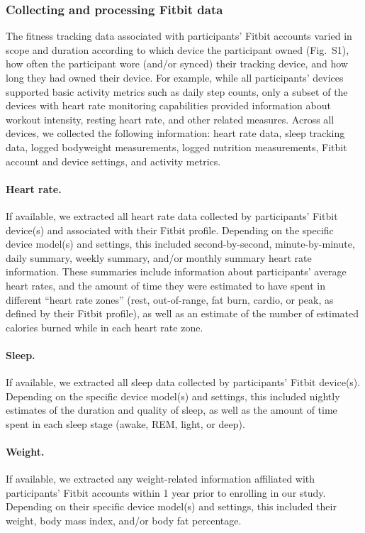 \documentclass[10pt]{article}
\newcommand{\devices}{S1}
\begin{document}
\subsubsection*{Collecting and processing Fitbit data}

The fitness tracking data associated with participants' Fitbit
accounts varied in scope and duration according to which device the
participant owned (Fig.~\devices), how often the participant wore
(and/or synced) their tracking device, and how long they had owned
their device.  For example, while all participants' devices supported
basic activity metrics such as daily step counts, only a subset of the
devices with heart rate monitoring capabilities provided information
about workout intensity, resting heart rate, and other related
measures.  Across all devices, we collected the following information:
heart rate data, sleep tracking data, logged bodyweight measurements,
logged nutrition measurements, Fitbit account and device settings, and
activity metrics.

\paragraph{Heart rate.}  If available, we extracted all heart rate
data collected by participants' Fitbit device(s) and associated with
their Fitbit profile.  Depending on the specific device model(s) and
settings, this included second-by-second, minute-by-minute, daily
summary, weekly summary, and/or monthly summary heart rate
information.  These summaries include information about participants'
average heart rates, and the amount of time they were estimated to
have spent in different ``heart rate zones'' (rest, out-of-range, fat
burn, cardio, or peak, as defined by their Fitbit profile), as well as
an estimate of the number of estimated calories burned while in each
heart rate zone.

\paragraph{Sleep.}  If available, we extracted all sleep data
collected by participants' Fitbit device(s).  Depending on the
specific device model(s) and settings, this included nightly estimates
of the duration and quality of sleep, as well as the amount of time
spent in each sleep stage (awake, REM, light, or deep).

\paragraph{Weight.}  If available, we extracted any weight-related
information affiliated with participants' Fitbit accounts within 1
year prior to enrolling in our study.  Depending on their specific
device model(s) and settings, this included their weight, body mass
index, and/or body fat percentage.
\end{document}
